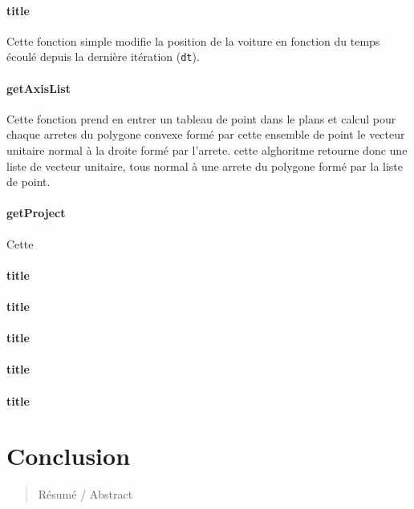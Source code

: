 \documentclass[11pt]{report}
\renewcommand{\tt}[1]{\texttt{#1}}
\begin{document}
\subsubsection{title}



Cette fonction simple modifie la position de la voiture en fonction du temps écoulé depuis la dernière itération (\tt{dt}).


\subsubsection{getAxisList}



Cette fonction prend en entrer un tableau de point dans le plans et calcul pour chaque arretes du polygone convexe formé par cette ensemble de point le vecteur unitaire normal à la droite formé par l'arrete.
cette alghoritme retourne donc une liste de vecteur unitaire, tous normal à une arrete du polygone formé par la liste de point.

\subsubsection{getProject}




Cette


\subsubsection{title}



\subsubsection{title}



\subsubsection{title}



\subsubsection{title}



\subsubsection{title}




\chapter*{Conclusion}


\begin{abstract}
Résumé / Abstract
\end{abstract}
\end{document}
